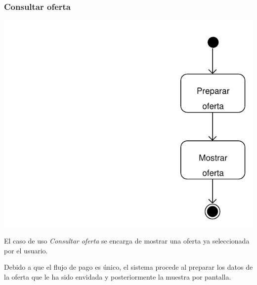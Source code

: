 \documentclass[11pt, a4paper, twoside, titlepage]{article}
\begin{document}
			\subsubsection{Consultar oferta}
				\begin{center}
					\hspace*{-3cm} \includegraphics[scale=.7]{analisis/diagramas/da_consultaroferta.pdf}
				\end{center}
				El caso de uso {\itshape Consultar oferta} se encarga de mostrar una oferta ya seleccionada por el usuario. 
				
				Debido a que el flujo de pago es único, el sistema procede al preparar los datos de la oferta que le ha sido envidada y posteriormente la muestra por pantalla.
\end{document}
